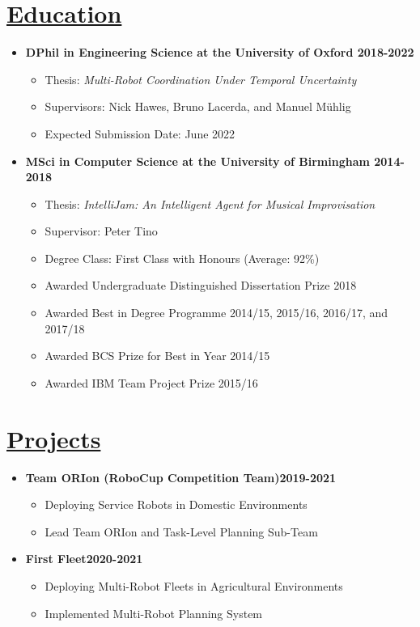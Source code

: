 \documentclass[11pt]{article}
\begin{document}
\section*{\uline{Education}}
\begin {itemize}
\item \textbf{DPhil in Engineering Science at the University of Oxford \hfill 2018-2022} 
\begin{itemize}
    \item Thesis: \emph{Multi-Robot Coordination Under Temporal Uncertainty}
    \item Supervisors: Nick Hawes, Bruno Lacerda, and Manuel M{\"u}hlig
    \item Expected Submission Date: June 2022
\end{itemize}
			
\item \textbf{MSci in Computer Science at the University of Birmingham \hfill 2014-2018}
\begin{itemize}
\item Thesis: \emph{IntelliJam: An Intelligent Agent for Musical Improvisation}
\item Supervisor: Peter Tino
\item Degree Class: First Class with Honours (Average: 92\%)
\item Awarded Undergraduate Distinguished Dissertation Prize 2018
\item Awarded Best in Degree Programme 2014/15, 2015/16, 2016/17, and 2017/18
\item Awarded BCS Prize for Best in Year 2014/15
\item Awarded IBM Team Project Prize 2015/16
\end{itemize}
\end{itemize}

\section*{\underline{Projects}}
\begin{itemize}
\item \textbf{Team ORIon (RoboCup Competition Team)\hfill 2019-2021}
\begin{itemize}
\item Deploying Service Robots in Domestic Environments
\item Lead Team ORIon and Task-Level Planning Sub-Team
\end{itemize}
\item \textbf{First Fleet\hfill 2020-2021}
\begin{itemize}
\item Deploying Multi-Robot Fleets in Agricultural Environments
\item Implemented Multi-Robot Planning System
\end{itemize}
\end{itemize}
\end{document}

